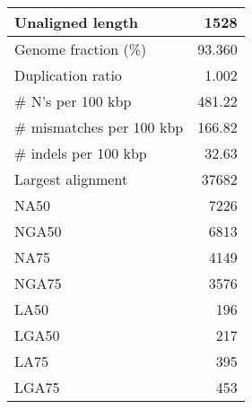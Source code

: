 \documentclass[12pt,a4paper]{article}
\begin{document}
\begin{table}[ht]
\begin{center}
\begin{tabular}{|l*{1}{|r}|}
Unaligned length & 1528 \\ \hline
Genome fraction (\%) & 93.360 \\ \hline
Duplication ratio & 1.002 \\ \hline
\# N's per 100 kbp & 481.22 \\ \hline
\# mismatches per 100 kbp & 166.82 \\ \hline
\# indels per 100 kbp & 32.63 \\ \hline
Largest alignment & 37682 \\ \hline
NA50 & 7226 \\ \hline
NGA50 & 6813 \\ \hline
NA75 & 4149 \\ \hline
NGA75 & 3576 \\ \hline
LA50 & 196 \\ \hline
LGA50 & 217 \\ \hline
LA75 & 395 \\ \hline
LGA75 & 453 \\ \hline
\end{tabular}
\end{center}
\end{table}
\end{document}
